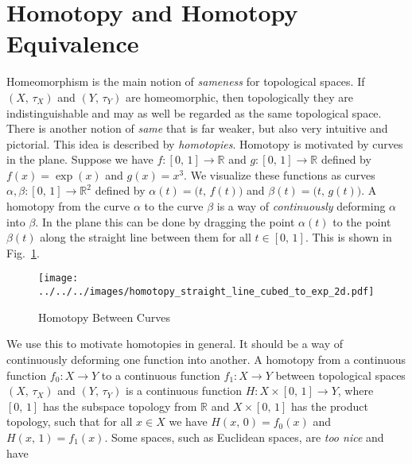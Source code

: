 \documentclass{article}
\theoremstyle{plain}
\theoremstyle{normal}
\newenvironment{definition}{%
    \pushQED{\qed}\renewcommand{\qedsymbol}{$\blacksquare$}\definitionx%
}{%
    \popQED\enddefinitionx%
}
\begin{document}
    \section{Homotopy and Homotopy Equivalence}
        Homeomorphism is the main notion of \textit{sameness} for topological
        spaces. If $(X,\,\tau_{X})$ and $(Y,\,\tau_{Y})$ are homeomorphic,
        then topologically they are indistinguishable and may as well be
        regarded as the same topological space. There is another notion of
        \textit{same} that is far weaker, but also very intuitive and
        pictorial. This idea is described by \textit{homotopies}. Homotopy
        is motivated by curves in the plane. Suppose we have
        $f:[0,\,1]\rightarrow\mathbb{R}$ and $g:[0,\,1]\rightarrow\mathbb{R}$
        defined by $f(x)=\exp(x)$ and $g(x)=x^{3}$. We visualize these functions
        as curves $\alpha,\beta:[0,\,1]\rightarrow\mathbb{R}^{2}$ defined by
        $\alpha(t)=\big(t,\,f(t)\big)$ and $\beta(t)=\big(t,\,g(t)\big)$. A
        homotopy from the curve $\alpha$ to the curve $\beta$ is a way of
        \textit{continuously} deforming $\alpha$ into $\beta$. In the plane this
        can be done by dragging the point $\alpha(t)$ to the point $\beta(t)$
        along the straight line between them for all $t\in[0,\,1]$. This is
        shown in Fig.~\ref{fig:homotopy_straight_line_cubed_to_exp_2d}.
        \begin{figure}
            \centering
            \texttt{[image: ../../../images/homotopy\_straight\_line\_cubed\_to\_exp\_2d.pdf]}
            \caption{Homotopy Between Curves}
            \label{fig:homotopy_straight_line_cubed_to_exp_2d}
        \end{figure}
        We use this to motivate homotopies in general. It should be a way of
        continuously deforming one function into another.
        \begin{definition}[\textbf{Homotopy}]
            A homotopy from a continuous function $f_{0}:X\rightarrow{Y}$ to
            a continuous function $f_{1}:X\rightarrow{Y}$ between topological
            spaces $(X,\,\tau_{X})$ and $(Y,\,\tau_{Y})$ is a continuous
            function $H:X\times[0,\,1]\rightarrow{Y}$, where $[0,\,1]$ has the
            subspace topology from $\mathbb{R}$ and $X\times[0,\,1]$ has the
            product topology, such that for all $x\in{X}$ we have
            $H(x,\,0)=f_{0}(x)$ and $H(x,\,1)=f_{1}(x)$.
        \end{definition}
        Some spaces, such as Euclidean spaces, are \textit{too nice} and have
\end{document}
